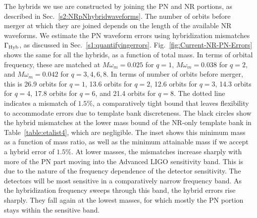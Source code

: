 The hybrids we use are constructed by joining the PN and NR portions, as 
described in Sec.~\ref{s2:NRpNhybridwaveforms}. The number of orbits before 
merger at which they are joined depends on the length of the available NR 
waveforms. We estimate the PN waveform errors using hybridization
mismatches $\Gamma_{\mathrm{Hyb}}$, as discussed in Sec.~\ref{s1:quantifyingerrors}. 
Fig.~\ref{fig:Current-NR-PN-Errors} shows the same for all the hybrids, as a 
function of total mass. In terms of orbital frequency, these are
matched at $M\omega_m=0.025$ for $q=1$, $M\omega_m=0.038$ for $q=2$,
and $M\omega_m=0.042$ for $q=3,4,6,8$. In terms of number of orbits
before merger, this is 26.9 orbits for $q=1$, 13.6 orbits for $q=2$,
12.6 orbits for $q=3$, 14.3 orbits for $q=4$, 17.8 orbits for $q=6$,
and 21.4 orbits for $q=8$. The dotted line indicates a mismatch of
$1.5\%$, a comparatively tight bound that leaves flexibility to accommodate
errors due to template bank discreteness. The black circles show the hybrid
mismatches at the lower mass bound of the NR-only template bank in
Table~\ref{table:etalist4}, which are negligible. The inset shows this minimum 
mass as a function of mass ratio, as well as the minimum attainable mass if we
accept a hybrid error of $1.5\%$. At lower masses, the mismatches increase
sharply with more of the PN part moving into the Advanced LIGO sensitivity band.
This is due to the nature of the frequency dependence of the detector 
sensitivity. The detectors will be most sensitive in a comparatively
narrow frequency band. As the hybridization frequency sweeps through this band, 
the hybrid errors rise sharply. They fall again at the lowest masses, for which
mostly the PN portion stays within the sensitive band.


